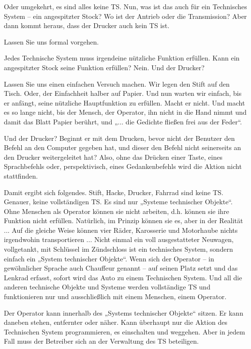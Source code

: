 \documentclass[11pt,a4paper]{article}
\begin{document}
Oder umgekehrt, es sind alles keine TS. Nun, was ist das auch für ein
Technisches System -- ein angespitzter Stock? Wo ist der Antrieb oder die
Transmission?  Aber dann kommt heraus, dass der Drucker auch kein TS ist.

Lassen Sie uns formal vorgehen. 

Jedes Technische System muss irgendeine nützliche Funktion erfüllen.
Kann ein angespitzter Stock seine Funktion erfüllen? Nein. Und der Drucker?

Lassen Sie uns einen einfachen Versuch machen. Wir legen den Stift auf den
Tisch. Oder, der Einfachheit halber auf Papier.  Und nun warten wir einfach,
bis er anfängt, seine nützliche Hauptfunktion zu erfüllen.  Macht er nicht.
Und macht es so lange nicht, bis der Mensch, der Operator, ihn nicht in die
Hand nimmt und damit das Blatt Papier berührt, und „... die Gedichte fließen
frei aus der Feder“.

Und der Drucker? Beginnt er mit dem Drucken, bevor nicht der Benutzer den
Befehl an den Computer gegeben hat, und dieser den Befehl nicht seinerseits an
den Drucker weitergeleitet hat? Also, ohne das Drücken einer Taste, eines
Sprachbefehls oder, perspektivisch, eines Gedankenbefehls wird die Aktion
nicht stattfinden.

Damit ergibt sich folgendes. Stift, Hacke, Drucker, Fahrrad sind keine TS.
Genauer, keine vollständigen TS. Es sind nur „Systeme technischer Objekte“.
Ohne Menschen als Operator können sie nicht arbeiten, d.h. können sie ihre
Funktion nicht erfüllen. Natürlich, im Prinzip können sie es, aber in der
Realität ... Auf die gleiche Weise können vier Räder, Karosserie und
Motorhaube nichts irgendwohin transportieren ... Nicht einmal ein voll
ausgestatteter Neuwagen, vollgetankt, mit Schlüssel im Zündschloss ist ein
technisches System, sondern einfach ein „System technischer Objekte“.  Wenn
sich der Operator -- in gewöhnlicher Sprache auch Chauffeur genannt -- auf
seinen Platz setzt und das Lenkrad erfasst, sofort wird das Auto zu einem
Technischen System. Und all die anderen technische Objekte und Systeme werden
vollständige TS und funktionieren nur und ausschließlich mit einem Menschen,
einem Operator.

Der Operator kann innerhalb des „Systems technischer Objekte“ sitzen. Er kann
daneben stehen, entfernter oder näher. Kann überhaupt nur die Aktion des
Technischen System programmieren, es einschalten und weggehen. Aber in jedem
Fall muss der Betreiber sich an der Verwaltung des TS beteiligen.
\end{document}
